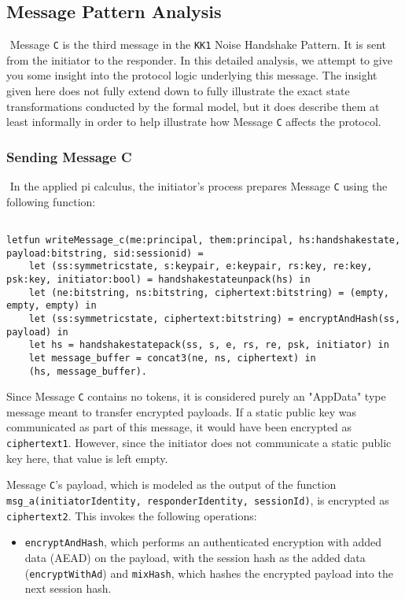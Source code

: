 \subsection{Message Pattern Analysis}$ $
Message \texttt{C} is the third message in the \texttt{KK1} Noise Handshake Pattern. It is sent from the initiator to the responder. In this detailed analysis, we attempt to give you some insight into the protocol logic underlying this message. The insight given here does not fully extend down to fully illustrate the exact state transformations conducted by the formal model, but it does describe them at least informally in order to help illustrate how Message \texttt{C} affects the protocol.


\subsubsection{Sending Message C}$ $
In the applied pi calculus, the initiator's process prepares Message \texttt{C} using the following function:


\begin{lstlisting}

letfun writeMessage_c(me:principal, them:principal, hs:handshakestate, payload:bitstring, sid:sessionid) =
	let (ss:symmetricstate, s:keypair, e:keypair, rs:key, re:key, psk:key, initiator:bool) = handshakestateunpack(hs) in
	let (ne:bitstring, ns:bitstring, ciphertext:bitstring) = (empty, empty, empty) in
	let (ss:symmetricstate, ciphertext:bitstring) = encryptAndHash(ss, payload) in
	let hs = handshakestatepack(ss, s, e, rs, re, psk, initiator) in
	let message_buffer = concat3(ne, ns, ciphertext) in
	(hs, message_buffer).

\end{lstlisting}

Since Message \texttt{C} contains no tokens, it is considered purely an "AppData" type message meant to transfer encrypted payloads.
If a static public key was communicated as part of this message, it would have been encrypted as \texttt{ciphertext1}. However, since the initiator does not communicate a static public key here, that value is left empty.


Message \texttt{C}'s payload, which is modeled as the output of the function \texttt{msg\_a(initiatorIdentity, responderIdentity, sessionId)}, is encrypted as \texttt{ciphertext2}. This invokes the following operations:


\begin{itemize}

\item \texttt{encryptAndHash}, which performs an authenticated encryption with added data (AEAD) on the payload, with the session hash as the added data (\texttt{encryptWithAd}) and \texttt{mixHash}, which hashes the encrypted payload into the next session hash.

\end{itemize}
